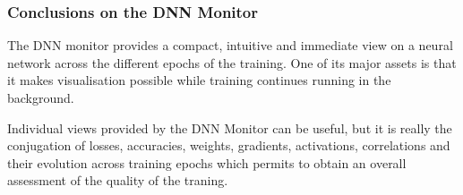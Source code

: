 \subsubsection{Conclusions on the DNN Monitor}

The DNN monitor provides a compact, intuitive and immediate view on a neural network across the different epochs of the training. One of its major assets is that it makes visualisation possible while training continues running in the background.

Individual views provided by the DNN Monitor can be useful, but it is really the conjugation of losses, accuracies, weights, gradients, activations, correlations and their evolution across training epochs which permits to obtain an overall assessment of the quality of the traning.









